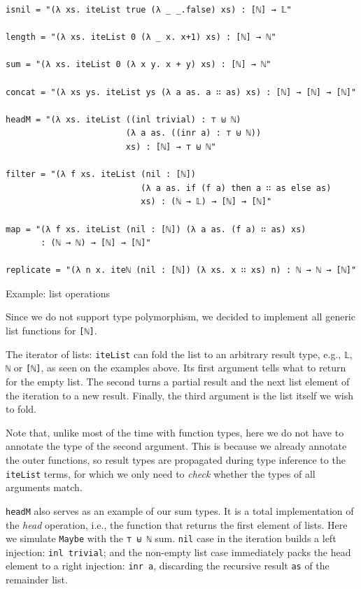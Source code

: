 \begin{listing}[H]
\begin{verbatim}
isnil = "(λ xs. iteList true (λ _ _.false) xs) : [ℕ] → 𝕃"

length = "(λ xs. iteList 0 (λ _ x. x+1) xs) : [ℕ] → ℕ"

sum = "(λ xs. iteList 0 (λ x y. x + y) xs) : [ℕ] → ℕ"

concat = "(λ xs ys. iteList ys (λ a as. a ∷ as) xs) : [ℕ] → [ℕ] → [ℕ]"

headM = "(λ xs. iteList ((inl trivial) : ⊤ ⊎ ℕ)
                        (λ a as. ((inr a) : ⊤ ⊎ ℕ))
                        xs) : [ℕ] → ⊤ ⊎ ℕ"

filter = "(λ f xs. iteList (nil : [ℕ])
                           (λ a as. if (f a) then a ∷ as else as)
                           xs) : (ℕ → 𝕃) → [ℕ] → [ℕ]"

map = "(λ f xs. iteList (nil : [ℕ]) (λ a as. (f a) ∷ as) xs)
       : (ℕ → ℕ) → [ℕ] → [ℕ]"

replicate = "(λ n x. iteℕ (nil : [ℕ]) (λ xs. x ∷ xs) n) : ℕ → ℕ → [ℕ]"
\end{verbatim}
\caption{Example: list operations}
\label{code:examples-lists}
\end{listing}

Since we do not support type polymorphism, we decided to implement all generic list functions for \verb$[ℕ]$.

The iterator of lists: \verb$iteList$ can fold the list to an arbitrary result type, e.g., \verb$𝕃$, \verb$ℕ$ or \verb$[ℕ]$, as seen on the examples above. Its first argument tells what to return for the empty list. The second turns a partial result and the next list element of the iteration to a new result. Finally, the third argument is the list itself we wish to fold.

Note that, unlike most of the time with function types, here we do not have to annotate the type of the second argument. This is because we already annotate the outer functions, so result types are propagated during type inference to the \verb$iteList$ terms, for which we only need to \textit{check} whether the types of all arguments match.

\verb$headM$ also serves as an example of our sum types. It is a total implementation of the \textit{head} operation, i.e., the function that returns the first element of lists. Here we simulate \verb$Maybe$ with the \verb$⊤ ⊎ ℕ$ sum. \verb$nil$ case in the iteration builds a left injection: \verb$inl trivial$; and the non-empty list case immediately packs the head element to a right injection: \verb$inr a$, discarding the recursive result \verb$as$ of the remainder list.

